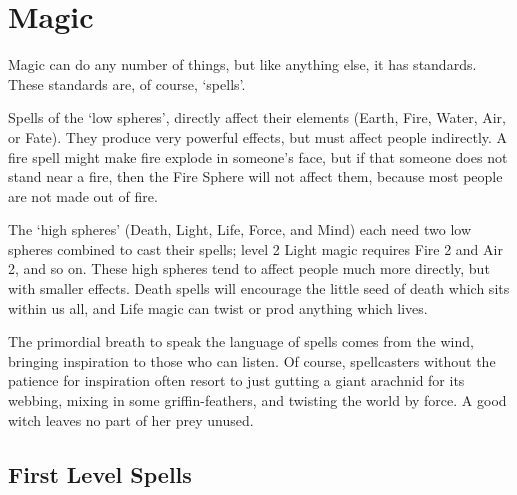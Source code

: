 \chapter[Chamber of Magic]{Magic}
\toggletrue{examplecharacter}

\begin{multicols}{2}

\noindent
Magic can do any number of things, but like anything else, it has standards.
These standards are, of course, `spells'.

Spells of the `low spheres', directly affect their elements (Earth, Fire, Water, Air, or Fate).
They produce very powerful effects, but must affect people indirectly.
A fire spell might make fire explode in someone's face, but if that someone does not stand near a fire, then the Fire Sphere will not affect them, because most people are not made out of fire.

The `high spheres' (Death, Light, Life, Force, and Mind) each need two low spheres combined to cast their spells; level 2 Light magic requires Fire 2 and Air 2, and so on.
These high spheres tend to affect people much more directly, but with smaller effects.
Death spells will encourage the little seed of death which sits within us all, and Life magic can twist or prod anything which lives.

The primordial breath to speak the language of spells comes from the wind, bringing inspiration to those who can listen.
Of course, spellcasters without the patience for inspiration often resort to just gutting a giant arachnid for its webbing, mixing in some griffin-feathers, and twisting the world by force.
A good witch leaves no part of her prey unused.



\end{multicols}

\section{First Level Spells}

